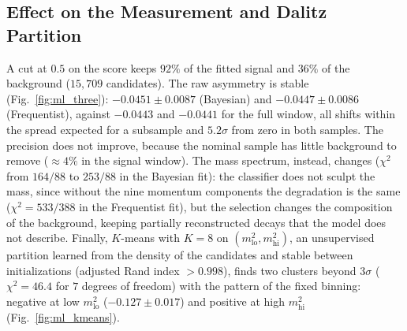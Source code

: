\subsection{Effect on the Measurement and Dalitz Partition}
\label{sec:ml_stability}
\label{sec:ml_kmeans}
A cut at $0.5$ on the score keeps $92\%$ of the fitted signal and $36\%$ of the background ($15{,}709$ candidates). The raw asymmetry is stable (Fig.~\ref{fig:ml_three}): $-0.0451\pm0.0087$ (Bayesian) and $-0.0447\pm0.0086$ (Frequentist), against $-0.0443$ and $-0.0441$ for the full window, all shifts within the spread expected for a subsample and $5.2\sigma$ from zero in both samples. The precision does not improve, because the nominal sample has little background to remove ($\approx4\%$ in the signal window). The mass spectrum, instead, changes ($\chi^2$ from $164/88$ to $253/88$ in the Bayesian fit): the classifier does not sculpt the mass, since without the nine momentum components the degradation is the same ($\chi^2=533/388$ in the Frequentist fit), but the selection changes the composition of the background, keeping partially reconstructed decays that the model does not describe. Finally, $K$-means with $K=8$ on $(m^2_{\mathrm{lo}},m^2_{\mathrm{hi}})$, an unsupervised partition learned from the density of the candidates and stable between initializations (adjusted Rand index $>0.998$), finds two clusters beyond $3\sigma$ ($\chi^2=46.4$ for $7$ degrees of freedom) with the pattern of the fixed binning: negative at low $m^2_{\mathrm{lo}}$ ($-0.127\pm0.017$) and positive at high $m^2_{\mathrm{hi}}$ (Fig.~\ref{fig:ml_kmeans}).


